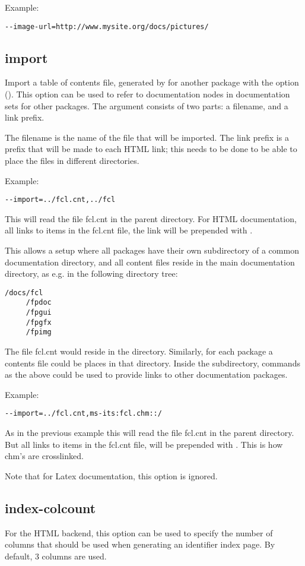 Example:
\begin{verbatim}
--image-url=http://www.mysite.org/docs/pictures/
\end{verbatim}


\subsection{import}
\label{suse:import}
Import a table of contents file, generated by \fpdoc for another package
with the  option (). This option can be used 
to refer to documentation nodes in documentation sets for other packages. 
The argument consists of two parts: a filename, and a link prefix. 

The filename is the name of the file that will be imported. The link
prefix is a prefix that will be made to each HTML link; this needs to be
done to be able to place the files in different directories.

Example:
\begin{verbatim}
--import=../fcl.cnt,../fcl
\end{verbatim}
This will read the file fcl.cnt in the parent directory. For HTML
documentation, all links to items in the fcl.cnt file, the link will be
prepended with .

This allows a setup where all packages have their own subdirectory of a
common documentation directory, and all content files reside in the main
documentation directory, as e.g. in the following directory tree:
\begin{verbatim}
/docs/fcl
     /fpdoc
     /fpgui
     /fpgfx
     /fpimg
\end{verbatim}
The file fcl.cnt would reside in the  directory. Similarly, for
each package a contents file  could be places in that
directory. Inside the subdirectory, commands as the above could be used to
provide links to other documentation packages.

Example:
\begin{verbatim}
--import=../fcl.cnt,ms-its:fcl.chm::/
\end{verbatim}
As in the previous example this will read the file fcl.cnt in the parent 
directory. But all links to items in the fcl.cnt file, will be prepended 
with . This is how chm's are crosslinked.

Note that for Latex documentation, this option is ignored.

\subsection{index-colcount}
\label{suse:index-file}
For the HTML backend, this option can be used to specify the number of
columns that should be used when generating an identifier index page.
By default, 3 columns are used.

